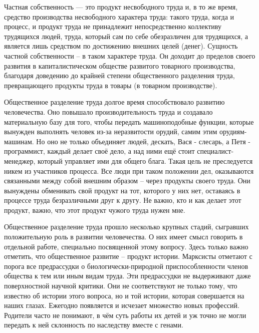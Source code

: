 \documentclass[../main]{subfiles}
\begin{document}
Частная собственность — это продукт несвободного труда и, в то же время, средство производства несвободного характера труда: такого труда, когда и процесс, и продукт труда не принадлежит непосредственно коллективу трудящихся людей, труда, который сам по себе обезразличен для трудящихся, а является лишь средством по достижению внешних целей (денег). Сущность частной собственности – в таком характере труда. Он доходит до пределов своего развития в капиталистическом обществе развитого товарного производства, благодаря доведению до крайней степени общественного разделения труда, превращающего продукты труда в товары (в товарном производстве).

Общественное разделение труда долгое время способствовало развитию человечества. Оно повышало производительность труда и создавало материальную базу для того, чтобы передать машиноподобные функции, которые вынужден выполнять человек из-за неразвитости орудий, самим этим орудиям-машинам. Но оно не только объединяет людей, дескать, Вася - слесарь, а Петя - программист, каждый делает своё дело, а над ними ещё стоит специалист-менеджер, который управляет ими для общего блага. Такая цель не преследуется никем из участников процесса. Все люди при таком положении дел, оказываются связанными между собой внешним образом – через продукты своего труда. Они вынуждены обменивать свой продукт на тот, которого у них нет, оставаясь в процессе труда безразличными друг к другу. Не важно, кто и как делает этот продукт, важно, что этот продукт чужого труда нужен мне.

Общественное разделение труда прошло несколько крупных стадий, сыгравших положительную роль в развитии человечества. О них имеет смысл говорить в отдельной работе, специально посвященной этому вопросу. Здесь только важно отметить, что общественное развитие – продукт истории. Марксисты отметают с порога все предрассудки о биологически-природной приспособленности членов общества к тем или иным видам труда. Эти предрассудки не выдерживают даже поверхностной научной критики. Они не соответствуют не только тому, что известно об истории этого вопроса, но и той истории, которая совершается на наших глазах. Ежегодно появляется и исчезает множество новых профессий. Родители часто не понимают, в чём суть работы их детей и уж точно не могли передать к ней склонность по наследству вместе с генами.
\end{document}
